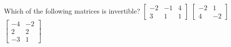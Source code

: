 \begin{activity}
Which of the following matrices is invertible?
{\(\begin{bmatrix} -2&-1&4\\3&1&1 \end{bmatrix}\)}
{\(\begin{bmatrix} -2&1\\4&-2 \end{bmatrix}\)}
{\(\begin{bmatrix} -4&-2\\2&2\\-3&1 \end{bmatrix}\)}
\end{activity}



